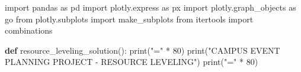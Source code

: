 \documentclass[
  letterpaper,
  DIV=11,
  numbers=noendperiod]{scrreprt}
\newenvironment{Shaded}{\begin{snugshade}}{\end{snugshade}}
\newcommand{\BuiltInTok}[1]{\textcolor[rgb]{0.00,0.23,0.31}{#1}}
\newcommand{\DecValTok}[1]{\textcolor[rgb]{0.68,0.00,0.00}{#1}}
\newcommand{\ImportTok}[1]{\textcolor[rgb]{0.00,0.46,0.62}{#1}}
\newcommand{\KeywordTok}[1]{\textcolor[rgb]{0.00,0.23,0.31}{\textbf{#1}}}
\newcommand{\NormalTok}[1]{\textcolor[rgb]{0.00,0.23,0.31}{#1}}
\newcommand{\OperatorTok}[1]{\textcolor[rgb]{0.37,0.37,0.37}{#1}}
\newcommand{\StringTok}[1]{\textcolor[rgb]{0.13,0.47,0.30}{#1}}
\begin{document}
\begin{Shaded}
\begin{Highlighting}[]
\ImportTok{import}\NormalTok{ pandas }\ImportTok{as}\NormalTok{ pd}
\ImportTok{import}\NormalTok{ plotly.express }\ImportTok{as}\NormalTok{ px}
\ImportTok{import}\NormalTok{ plotly.graph\_objects }\ImportTok{as}\NormalTok{ go}
\ImportTok{from}\NormalTok{ plotly.subplots }\ImportTok{import}\NormalTok{ make\_subplots}
\ImportTok{from}\NormalTok{ itertools }\ImportTok{import}\NormalTok{ combinations}

\KeywordTok{def}\NormalTok{ resource\_leveling\_solution():}
    \BuiltInTok{print}\NormalTok{(}\StringTok{"="} \OperatorTok{*} \DecValTok{80}\NormalTok{)}
    \BuiltInTok{print}\NormalTok{(}\StringTok{"CAMPUS EVENT PLANNING PROJECT {-} RESOURCE LEVELING"}\NormalTok{)}
    \BuiltInTok{print}\NormalTok{(}\StringTok{"="} \OperatorTok{*} \DecValTok{80}\NormalTok{)}
    

\end{Highlighting}
\end{Shaded}
\end{document}
